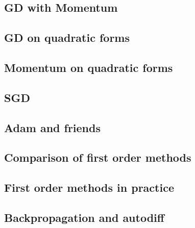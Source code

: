 \subsection{GD with Momentum}


\subsection{GD on quadratic forms}


\subsection{Momentum on quadratic forms}


\subsection{SGD}


\subsection{Adam and friends}


\subsection{Comparison of first order methods}


\subsection{First order methods in practice}


\subsection{Backpropagation and autodiff}


